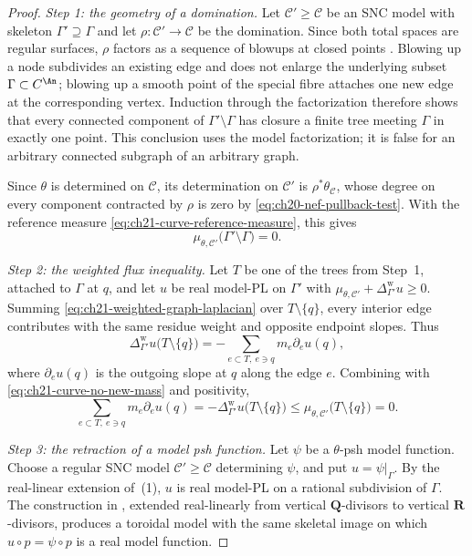 \begin{proof}
\emph{Step 1: the geometry of a domination.}  Let
$\mathcal C'\geq\mathcal C$ be an SNC model with skeleton
$\Gamma'\supseteq\Gamma$ and let $\rho:\mathcal C'\to\mathcal C$ be the
domination.  Since both total spaces are regular surfaces, $\rho$ factors
as a sequence of blowups at closed points
\cite[\href{https://stacks.math.columbia.edu/tag/0C5R}{Tag~0C5R}]{StacksProject}.
Blowing up a node subdivides an existing
edge and does not enlarge the underlying subset $\Gamma\subset C^{\An}$;
blowing up a smooth point of the special fibre attaches one new edge at the
corresponding vertex.  Induction through the factorization therefore shows
that every connected component of $\Gamma'\setminus\Gamma$ has closure a
finite tree meeting $\Gamma$ in exactly one point.  This conclusion uses
the model factorization; it is false for an arbitrary connected subgraph of
an arbitrary graph.

Since $\theta$ is determined on $\mathcal C$, its determination on
$\mathcal C'$ is $\rho^*\theta_{\mathcal C}$, whose degree on every
component contracted by $\rho$ is zero by
\eqref{eq:ch20-nef-pullback-test}.  With the reference measure
\eqref{eq:ch21-curve-reference-measure}, this gives
\begin{equation}
\label{eq:ch21-curve-no-new-mass}
 \mu_{\theta,\mathcal C'}
       \bigl(\Gamma'\setminus\Gamma\bigr)=0 .
\end{equation}

\emph{Step 2: the weighted flux inequality.}  Let $T$ be one of the trees
from Step~1, attached to $\Gamma$ at $q$, and let $u$ be real
model-PL on $\Gamma'$ with
$\mu_{\theta,\mathcal C'}+\Delta^{\mathrm w}_{\Gamma'}u\geq0$.
Summing \eqref{eq:ch21-weighted-graph-laplacian} over
$T\setminus\{q\}$, every interior edge contributes with the same residue
weight and opposite endpoint slopes.  Thus
\[
 \Delta^{\mathrm w}_{\Gamma'}u\bigl(T\setminus\{q\}\bigr)
 =-\sum_{e\subset T,\ e\ni q}m_e\partial_e u(q),
\]
where $\partial_e u(q)$ is the outgoing slope at $q$ along the edge
$e$.  Combining with \eqref{eq:ch21-curve-no-new-mass} and positivity,
\begin{equation}
\label{eq:ch21-curve-flux}
 \sum_{e\subset T,\ e\ni q}m_e\partial_e u(q)
 =-\Delta^{\mathrm w}_{\Gamma'}u\bigl(T\setminus\{q\}\bigr)
 \leq\mu_{\theta,\mathcal C'}
          \bigl(T\setminus\{q\}\bigr)=0 .
\end{equation}

\emph{Step 3: the retraction of a model psh function.}  Let $\psi$ be a
$\theta$-psh model function.  Choose a regular SNC model
$\mathcal C'\geq\mathcal C$ determining $\psi$, and put
$u=\psi|_\Gamma$.  By
the real-linear extension of
\,(1), $u$ is real model-PL on a
rational subdivision of $\Gamma$.  The construction in
, extended real-linearly from vertical
$\mathbf Q$-divisors to vertical $\mathbf R$-divisors, produces a
toroidal model with the same skeletal image on which
$u\circ p=\psi\circ p$ is a real model function.


\end{proof}
